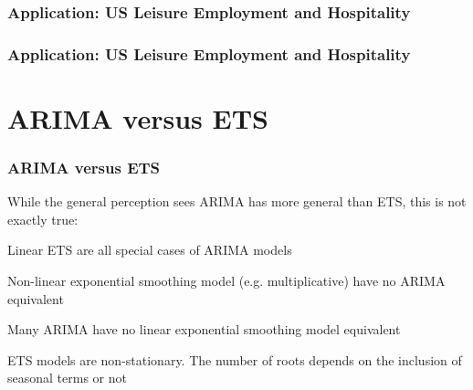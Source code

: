 \documentclass{beamer}
\newenvironment{wideitemize}{\itemize\addtolength{\itemsep}{10pt}}{\enditemize}
\begin{document}
\begin{frame}
  \frametitle{Application:  US Leisure Employment and Hospitality}
\end{frame}


\begin{frame}
  \frametitle{Application:  US Leisure Employment and Hospitality}
\end{frame}


\section{ARIMA versus ETS}


\begin{frame}
  \frametitle{ARIMA versus ETS}
  While the general perception sees ARIMA has more general than ETS, this is not exactly true:

  \begin{wideitemize}
  \item Linear ETS are all special cases of ARIMA models
  \item Non-linear exponential smoothing model (e.g. multiplicative) have no ARIMA equivalent
  \item Many ARIMA have no linear exponential smoothing model equivalent
  \item ETS models are non-stationary. The number of roots depends on the inclusion of seasonal terms or not
  \end{wideitemize}
\end{frame}
\end{document}
